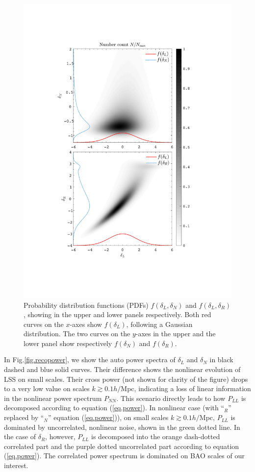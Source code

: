 \documentclass[aps,prd,twocolumn,superscriptaddress,amsfont,amssymb,amsmath,nofootinbib,showpacs,balancelastpage]{revtex4-1}
\begin{document}
\begin{figure}[t] \centering
  \includegraphics[width=1.0\linewidth]{pdfs.pdf}
  \caption{Probability distribution functions (PDFs)
  $f(\delta_L,\delta_N)$ and $f(\delta_L,\delta_R)$, showing in the upper
  and lower panels respectively. Both red curves on the $x$-axes show $f(\delta_L)$, following
  a Gaussian distribution. The two curves on the $y$-axes in the upper and the lower panel
  show respectively $f(\delta_N)$ and $f(\delta_R)$.}
  \label{fig.pdfs}
\end{figure}

In Fig.\ref{fig.recopower}, we show the auto power spectra of
$\delta_L$ and $\delta_N$ in black dashed and blue solid curves.
Their difference shows the nonlinear evolution of LSS on 
small scales. Their cross power (not shown for clarity of the figure)
drops to a very low value on scales $k\gtrsim 0.1h/$Mpc,
indicating a loss of linear information in the
nonlinear power spectrum $P_{NN}$. This scenario directly
leads to how $P_{LL}$ is decomposed according to equation
(\ref{eq.power}). In nonlinear case (with ``$_R$'' replaced
by ``$_N$'' equation (\ref{eq.power})), on small
scales $k\gtrsim 0.1h/$Mpc, $P_{LL}$ is dominated by
uncorrelated, nonlinear noise, shown in the green
dotted line. In the case of $\delta_R$, however, $P_{LL}$
is decomposed into the orange dash-dotted correlated
part and the purple dotted uncorrelated part according to
equation (\ref{eq.power}). The correlated power spectrum
is dominated on BAO scales of our interest.
\end{document}
